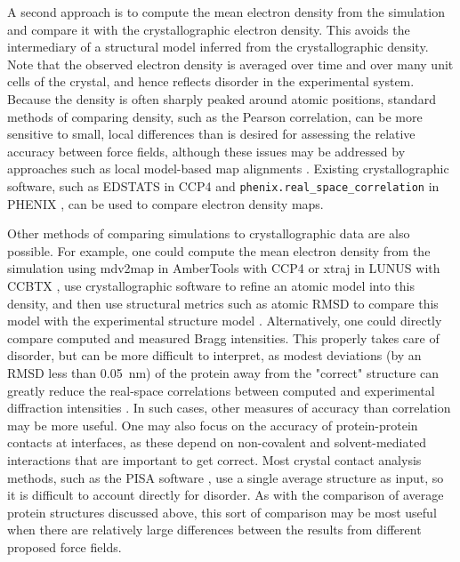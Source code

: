 \documentclass[9pt,review]{livecoms}
\begin{document}
A second approach is to compute the mean electron density from the simulation \cite{grosse-kunstleve_computational_2002,wall_methods_2009,winn_overview_2011,case_amber_2022} and compare it with the crystallographic electron density.
This avoids the intermediary of a structural model inferred from the crystallographic density.
Note that the observed electron density is averaged over time and over many unit cells of the crystal, and hence reflects disorder in the experimental system.
Because the density is often sharply peaked around atomic positions, standard methods of comparing density, such as the Pearson correlation, can be more sensitive to small, local differences than is desired for assessing the relative accuracy between force fields, although these issues may be addressed by approaches such as local model-based map alignments \cite{pearce_multi-crystal_2017}.
Existing crystallographic software, such as EDSTATS in CCP4 \cite{winn_overview_2011} and \verb|phenix.real_space_correlation| in PHENIX \cite{liebschner_macromolecular_2019}, can be used to compare electron density maps.

Other methods of comparing simulations to crystallographic data are also possible.
For example, one could compute the mean electron density from the simulation using mdv2map in AmberTools with CCP4 \cite{winn_overview_2011,case_amber_2022} or xtraj in LUNUS with CCBTX \cite{grosse-kunstleve_computational_2002,wall_methods_2009}, use crystallographic software to refine an atomic model into this density, and then use structural metrics such as atomic RMSD to compare this model with the experimental structure model \cite{wych_molecular-dynamics_2023}.
Alternatively, one could directly compare computed and measured Bragg intensities.
This properly takes care of disorder, but can be more difficult to interpret, as modest deviations (by an RMSD less than \qty{0.05}{\nano\meter}) of the protein away from the "correct" structure can greatly reduce the real-space correlations between computed and experimental diffraction intensities \cite{wall_internal_2018}.
In such cases, other measures of accuracy than correlation may be more useful.
One may also focus on the accuracy of protein-protein contacts at interfaces, as these depend on non-covalent and solvent-mediated interactions that are important to get correct.
Most crystal contact analysis methods, such as the PISA software \cite{krissinel_inference_2007}, use a single average structure as input, so it is difficult to account directly for disorder.
As with the comparison of average protein structures discussed above, this sort of comparison may be most useful when there are relatively large differences between the results from different proposed force fields.
\end{document}
